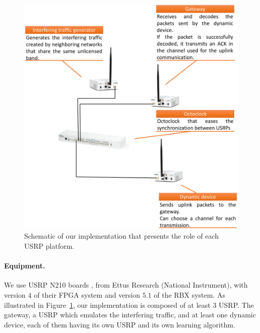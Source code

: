 \begin{figure}[!b]
    \centering
    \includegraphics[width=0.75\linewidth]{our-demo.eps}
    \caption{Schematic of our implementation that presents the role of each USRP platform.}
    \label{fig:42:our_demo}
\end{figure}


\paragraph{Equipment.}
We use USRP N210 boards \cite{USRPDocumentation}, from Ettus Research (National Instrument),
with version $4$ of their FPGA system and version $5.1$ of the RBX system.
As illustrated in Figure~\ref{fig:42:our_demo}, our implementation is composed of at least $3$ USRP.
The gateway, a USRP which emulates the interfering traffic, and at least one dynamic device, each of them having its own USRP and its own learning algorithm.

